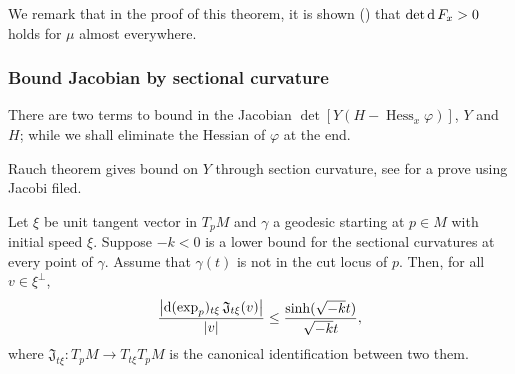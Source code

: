 We remark that in the proof of this theorem,
it is shown (\cite[Claim 4.3 and Claim 4.4]{cordero2001riemannian}) that
$\det \operatorname{d} F_x > 0$ holds for $\mu$ almost everywhere.

\subsubsection{Bound Jacobian by sectional curvature}

There are two terms to bound in the Jacobian $\det[ Y(H - \operatorname{Hess}_x \varphi)]$, $Y$ and $H$;
while we shall eliminate the Hessian of $\varphi$ at the end.

Rauch theorem gives bound on $Y$ through section curvature, see
\cite[Theorem IX.2.3]{chavel2006riemannian} for a prove using Jacobi filed.
\begin{prop} 
	Let $\xi$ be unit tangent vector in $T_p M$
	and $\gamma$ a geodesic starting at $p \in M$ with initial speed $\xi$.
	Suppose \( - k < 0 \) is a lower bound for
	the sectional curvatures at every point of \( \gamma \).
	Assume that \( \gamma (t)\) is not in the cut locus of $p$.
	Then, for all \( v \in \xi ^ { \perp } \),
	\begin{equation*}
		\frac { \left| \operatorname{d} ( \exp _ { p })  _ {t \xi } \,
			\mathfrak{J}_{t \xi}( v )\right| } { | v | }
		\leq \frac { \sinh (\sqrt{ -k } t )} {\sqrt{-k} t },
	\end{equation*}
	where $\mathfrak{J}_{t \xi}: T_p M \rightarrow T_{t \xi} T_p M$ is the canonical identification
	between two them.
\end{prop}

